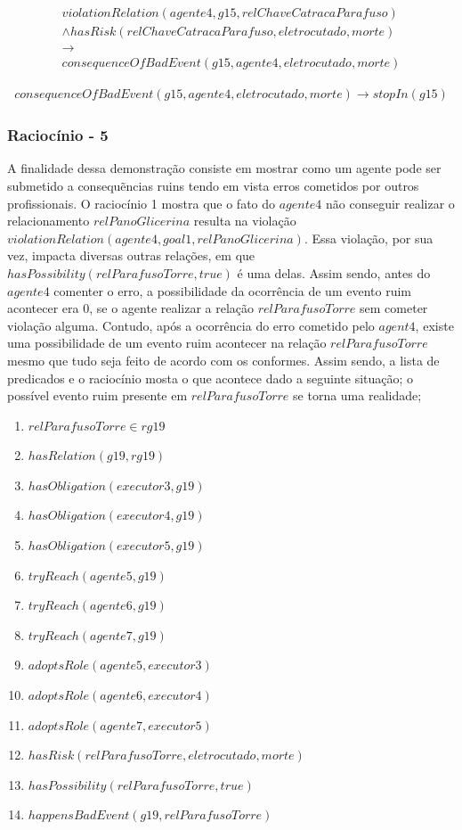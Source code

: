 \documentclass[12pt]{article}
\begin{document}
\begin{eqnarray}\nonumber
	violationRelation(agente4,g15,relChaveCatracaParafuso) \nonumber \\ 
	 \wedge hasRisk(relChaveCatracaParafuso,eletrocutado,morte) \nonumber \\ 
	\to \nonumber \\ 
	consequenceOfBadEvent(g15,agente4,eletrocutado,morte)
\end{eqnarray}

\begin{eqnarray}
	consequenceOfBadEvent(g15,agente4,eletrocutado,morte) \to stopIn(g15)
\end{eqnarray}

\subsubsection{Raciocínio - 5} 

A finalidade dessa demonstração consiste em mostrar como um agente pode ser submetido a consequẽncias ruins tendo em vista erros cometidos por outros profissionais. O raciocínio 1 mostra que o fato do $agente4$ não conseguir realizar o relacionamento $relPanoGlicerina$ resulta na violação $violationRelation(agente4,goal1,relPanoGlicerina)$. Essa violação, por sua vez, impacta diversas outras relações, em que $hasPossibility(relParafusoTorre,true)$ é uma delas. Assim sendo, antes do $agente4$ comenter o erro, a possibilidade da ocorrência de um evento ruim acontecer era 0, se o agente realizar a relação $relParafusoTorre$ sem cometer violação alguma. Contudo, após a ocorrência do erro cometido pelo $agent4$, existe uma possibilidade de um evento ruim acontecer na relação $relParafusoTorre$ mesmo que tudo seja feito de acordo com os conformes. Assim sendo, a lista de predicados e o raciocínio mosta o que acontece dado a seguinte situação; o possível evento ruim presente em $relParafusoTorre$ se torna uma realidade;  

\begin{enumerate}
	\item $relParafusoTorre \in rg19$	
	\item $hasRelation(g19,rg19)$		
	\item $hasObligation(executor3,g19)$
	\item $hasObligation(executor4,g19)$
	\item $hasObligation(executor5,g19)$		
	\item $tryReach(agente5,g19)$
	\item $tryReach(agente6,g19)$
	\item $tryReach(agente7,g19)$									
	\item $adoptsRole(agente5,executor3)$
	\item $adoptsRole(agente6,executor4)$
	\item $adoptsRole(agente7,executor5)$
	\item $hasRisk(relParafusoTorre,eletrocutado,morte)$
	\item $hasPossibility(relParafusoTorre,true)$
	\item $happensBadEvent(g19,relParafusoTorre)$	
\end{enumerate}
\end{document}
